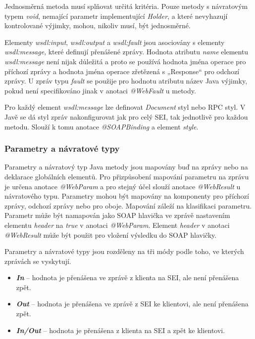 \documentclass[11pt,twoside,a4paper]{book}
\begin{document}
Jednosměrná metoda musí splňovat určitá kritéria. Pouze metody s
návratovým typem {\em void}, nemající parametr implementující {\em Holder}, a
které nevyhazují kontrolované výjimky, mohou, nikoliv musí, být jednosměrné.

Elementy {\em wsdl:input}, {\em wsdl:output} a {\em wsdl:fault} jsou asociovány
s elementy {\em wsdl:message}, které definují přenášené zprávy. Hodnota atributu
{\em name} elementu {\em wsdl:message} není nijak důležitá a proto se používá
hodnota jména operace pro příchozí zprávy a hodnota jména operace zřetězená s
„Response“ pro odchozí zprávy. U zpráv typu {\em fault} se použije pro hodnotu
atributu název Java výjimky, pokud není specifikováno jinak v anotaci {\em
@WebFault} u metody.

Pro každý element {\em wsdl:message} lze definovat {\em Document} styl nebo RPC
styl.
V Javě se dá styl zpráv nakonfigurovat jak pro celý SEI, tak jednotlivě pro každou metodu. Slouží k tomu
anotace {\em @SOAPBinding} a element {\em style}.

\subsubsection{Parametry a návratové typy}

Parametry a návratový typ Java metody jsou mapovány buď na zprávy nebo na deklarace
globálních elementů. Pro přizpůsobení mapování parametru na zprávu je určena
anotace {\em @WebParam} a pro stejný účel slouží anotace {\em @WebResult} u
návratového typu. Parametry mohou být mapovány na komponenty pro příchozí zprávy, odchozí zprávy nebo pro oboje.
Mapování záleží na klasifikaci parametru. Parametr může být namapován jako SOAP
hlavička ve zprávě nastavením elementu {\em header} na {\em true} v anotaci
{\em @WebParam}.
Element {\em header} v anotaci {\em @WebResult} může být použit pro vložení
výsledku do SOAP hlavičky.

Parametry a návratové typy jsou rozděleny na tři módy podle toho, ve kterých zprávách se
vyskytují.

\begin{itemize}
  \item \textbf{\textit{In}} – hodnota je přenášena ve zprávě z klienta na
  SEI, ale není přenášena zpět.
  \item \textbf{\textit{Out}} – hodnota je přenášena ve zprávě z SEI ke
  klientovi, ale není přenášena zpět.
  \item \textbf{\textit{In/Out}} – hodnota je přenášena z klienta na SEI a
  zpět ke klientovi.
\end{itemize}
\end{document}
